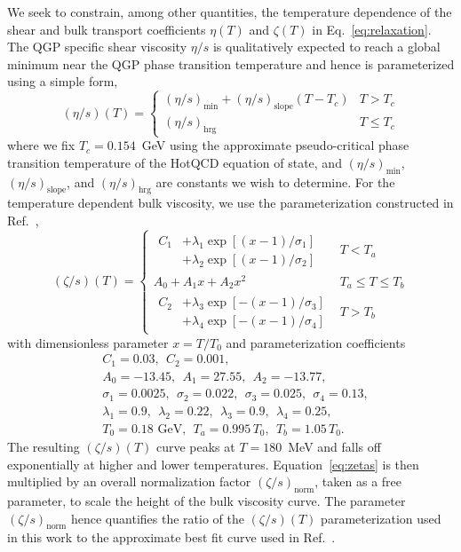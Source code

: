 \documentclass[aps,prc,reprint,amsmath,nofootinbib,superscriptaddress]{revtex4-1}
\begin{document}
We seek to constrain, among other quantities, the temperature dependence of the shear and bulk transport coefficients $\eta(T)$ and $\zeta(T)$ in Eq.~\eqref{eq:relaxation}.
The QGP specific shear viscosity $\eta/s$ is qualitatively expected to reach a global minimum near the QGP phase transition temperature and hence is parameterized using a simple form,
\begin{equation}
  (\eta/s)(T) =
  \begin{cases}
    (\eta/s)_\text{min} + (\eta/s)_\text{slope} (T - T_c) & T > T_c \\
    (\eta/s)_\text{hrg}                                   & T \le T_c
  \end{cases}
  \label{eq:etas}
\end{equation}
where we fix $T_c = 0.154$~GeV using the approximate pseudo-critical phase transition temperature of the HotQCD equation of state, and $(\eta/s)_\text{min}$, $(\eta/s)_\text{slope}$, and $(\eta/s)_\text{hrg}$ are constants we wish to determine.
For the temperature dependent bulk viscosity, we use the parameterization constructed in Ref.~\cite{Denicol:2009am, Ryu:2015vwa},
\begin{equation}
  (\zeta/s)(T) =
  \begin{cases}
    \begin{aligned}
      C_1 &+ \lambda_1 \exp [(x-1)/\sigma_1]  \\ &+ \lambda_2 \exp [ (x-1)/\sigma_2]
    \end{aligned}
    &T < T_a \\[3ex]
    A_0 + A_1 x + A_2 x^2 &T_a \le T \le T_b \\[2ex]
    \begin{aligned}
      C_2 &+ \lambda_3 \exp [-(x-1)/\sigma_3]  \\ &+ \lambda_4 \exp [-(x-1)/\sigma_4]
    \end{aligned}
    &T > T_b
  \end{cases}
  \label{eq:zetas}
\end{equation}
with dimensionless parameter $x = T/T_0$ and parameterization coefficients
\begin{align*}
  &C_1=0.03, ~~C_2=0.001, \\
  &A_0=-13.45, ~~A_1=27.55, ~~A_2=-13.77, \\
  &\sigma_1=0.0025, ~~\sigma_2=0.022, ~~\sigma_3=0.025, ~~\sigma_4=0.13, \\
  &\lambda_1=0.9, ~~\lambda_2=0.22, ~~\lambda_3=0.9, ~~\lambda_4=0.25, \\
  &T_0 = 0.18 \text{ GeV}, ~~T_a = 0.995\, T_0, ~~T_b = 1.05\, T_0.
\end{align*}
The resulting $(\zeta/s)(T)$ curve peaks at $T=180$~MeV and falls off exponentially at higher and lower temperatures.
Equation~\eqref{eq:zetas} is then multiplied by an overall normalization factor $(\zeta/s)_\text{norm}$, taken as a free parameter, to scale the height of the bulk viscosity curve.
The parameter $(\zeta/s)_\text{norm}$ hence quantifies the ratio of the $(\zeta/s)(T)$ parameterization used in this work to the approximate best fit curve used in Ref.~\cite{Ryu:2015vwa}.
\end{document}
